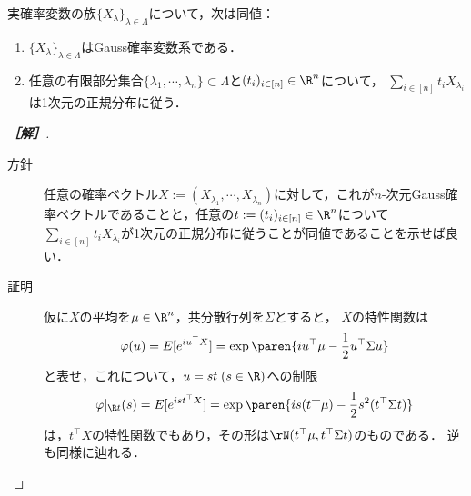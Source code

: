 \documentclass[uplatex,dvipdfmx]{jsarticle}
\begin{document}
\begin{problem*}[31]
    実確率変数の族$\{X_\lambda\}_{\lambda\in\Lambda}$について，次は同値：
    \begin{enumerate}
        \item $\{X_\lambda\}_{\lambda\in\Lambda}$はGauss確率変数系である．
        \item 任意の有限部分集合$\{\lambda_1,\cdots,\lambda_n\}\subset\Lambda$と$(t_i)_{i\in[n]}\in\R^n$について，
        $\sum_{i\in[n]}t_iX_{\lambda_i}$は1次元の正規分布に従う．
    \end{enumerate}
\end{problem*}
\begin{proof}[\bf［解］]\mbox{}
    \begin{description}
        \item[方針] 任意の確率ベクトル$X:=(X_{\lambda_1},\cdots,X_{\lambda_n})$に対して，これが$n$-次元Gauss確率ベクトルであることと，任意の$t:=(t_i)_{i\in[n]}\in\R^n$について$\sum_{i\in[n]}t_iX_{\lambda_i}$が1次元の正規分布に従うことが同値であることを示せば良い．
        \item[証明] 仮に$X$の平均を$\mu\in\R^n$，共分散行列を$\Sigma$とすると，
        $X$の特性関数は
        \[\varphi(u)=E[e^{iu^\top X}]=\exp\paren{iu^\top\mu-\frac{1}{2}u^\top\Sigma u}\]
        と表せ，これについて，$u=st\;(s\in\R)$への制限
        \[\varphi|_{\R t}(s)=E[e^{ist^\top X}]=\exp\paren{is(t\top\mu)-\frac{1}{2}s^2(t^\top\Sigma t)}\]
        は，$t^\top X$の特性関数でもあり，その形は$\rN(t^\top\mu,t^\top\Sigma t)$のものである．
        逆も同様に辿れる．
    \end{description}
\end{proof}
\end{document}
